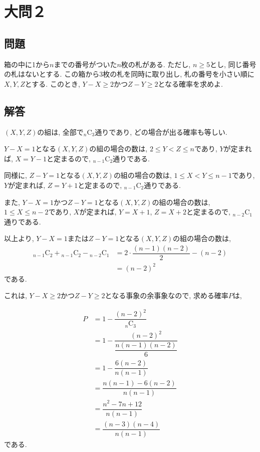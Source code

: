 \documentclass[dvipdfmx,a4paper]{jsarticle}
\newcommand{\comb}[2]{{}_{#1}\mathrm{C}_{#2}}
\newcommand{\2}{I\hspace{-1pt}I}
\newcommand{\3}{I\hspace{-1pt}I\hspace{-1pt}I}
\begin{document}
    \section{大問２}
    \subsection{問題}
    箱の中に1から$n$までの番号がついた$n$枚の札がある. ただし, $n\geq 5$とし, 同じ番号の札はないとする. 
    この箱から3枚の札を同時に取り出し, 札の番号を小さい順に$X, Y, Z$とする. このとき, 
    $Y-X \geq 2$かつ$Z-Y \geq 2$となる確率を求めよ. 

    \subsection{解答}
    $(X,Y,Z)$の組は, 全部で$\comb{n}{3}$通りであり, どの場合が出る確率も等しい. 

    $Y-X=1$となる$(X,Y,Z)$の組の場合の数は, $2\leq Y <Z\leq n$であり, $Y$が定まれば, 
    $X=Y-1$と定まるので, $\comb{n-1}{2}$通りである. 

    同様に, $Z-Y=1$となる$(X,Y,Z)$の組の場合の数は, $1\leq X< Y \leq n-1$であり, $Y$が定まれば, 
    $Z=Y+1$と定まるので, $\comb{n-1}{2}$通りである. 

    また, $Y-X=1$かつ$Z-Y=1$となる$(X,Y,Z)$の組の場合の数は, 
    $1 \leq X \leq n-2$であり, $X$が定まれば, $Y=X+1$, $Z=X+2$と定まるので, 
    $\comb{n-2}{1}$通りである. 

    以上より, $Y-X=1$または$Z-Y=1$となる$(X,Y,Z)$の組の場合の数は, 
    \begin{align*}
        \comb{n-1}{2} + \comb{n-1}{2} - \comb{n-2}{1} &=
        2 \cdot \dfrac{(n-1)(n-2)}{2} - (n-2) \\
        &= (n-2)^2
    \end{align*}
    である. 

    これは, $Y-X \geq 2$かつ$Z-Y \geq 2$となる事象の余事象なので, 
    求める確率$P$は, 

    \begin{align*}
        P &= 1 - \dfrac{(n-2)^2}{\comb{n}{3}} \\
        &= 1 - \dfrac{(n-2)^2}{\dfrac{n(n-1)(n-2)}{6}} \\
        &= 1 - \dfrac{6(n-2)}{n(n-1)} \\
        &= \dfrac{n(n-1) - 6(n-2)}{n(n-1)} \\
        &= \dfrac{n^2 -7n + 12}{n(n-1)} \\
        &= \dfrac{(n-3)(n-4)}{n(n-1)}
    \end{align*}
    である. 
\end{document}
